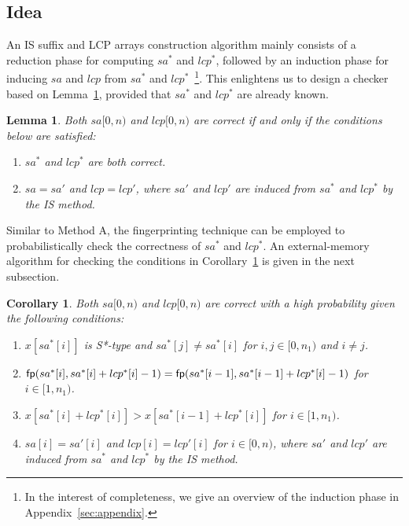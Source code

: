 \documentclass[10pt,journal,compsoc]{IEEEtran}
\newtheorem{Lemma}{Lemma}
\newtheorem{Corollary}{Corollary}
\begin{document}
\subsection{Idea} \label{sec:method2:idea}

An IS suffix and LCP arrays construction algorithm mainly consists of a reduction phase for computing $sa^*$ and $lcp^*$, followed by an induction phase for inducing $sa$ and $lcp$ from $sa^*$ and $lcp^*$~\footnote{In the interest of completeness, we give an overview of the induction phase in Appendix~\ref{sec:appendix}.}. This enlightens us to design a checker based on Lemma~\ref{lemma:2}, provided that $sa^*$ and $lcp^*$ are already known. 
	
\begin{Lemma} \label{lemma:2}
Both $sa[0, n)$ and $lcp[0, n)$ are correct if and only if the conditions below are satisfied:

\begin{enumerate}[(1)]
	\item
	$sa^*$ and $lcp^*$ are both correct.
	\item
	$sa = sa'$ and $lcp = lcp'$, where $sa'$ and $lcp'$ are induced from $sa^*$ and $lcp^*$ by the IS method.
\end{enumerate}
\end{Lemma}

Similar to Method A, the fingerprinting technique can be employed to probabilistically check the correctness of $sa^*$ and $lcp^*$. An external-memory algorithm for checking the conditions in Corollary~\ref{corollary:2} is given in the next subsection.


\begin{Corollary} \label{corollary:2}
Both $sa[0, n)$ and $lcp[0, n)$ are correct with a high probability given the following conditions:
\begin{enumerate}[(1)]
	\item
	$x[sa^*[i]]$ is S*-type and $sa^*[j] \ne sa^*[i]$ for $i, j \in [0, n_1)$ and $i \ne j$.
	\item
	${\sf fp}(sa^*[i], sa^*[i] + lcp^*[i] - 1) = {\sf fp}(sa^*[i - 1], sa^*[i - 1] + lcp^*[i] - 1)$ for $i \in [1,n_1)$.
	\item
	$x[sa^*[i] + lcp^*[i]] > x[sa^*[i - 1] + lcp^*[i]]$ for $i \in [1, n_1)$.
	\item
	$sa[i] = sa'[i]$ and $lcp[i] = lcp'[i]$ for $i \in [0, n)$, where $sa'$ and $lcp'$ are induced from $sa^*$ and $lcp^*$ by the IS method.
\end{enumerate}
\end{Corollary}
\end{document}
